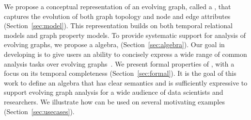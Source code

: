 
%
%
We propose a conceptual representation of an evolving graph, called a
\tg, that captures the evolution of both graph topology and node and
edge attributes (Section~\ref{sec:model}).  This representation builds
on both temporal relational models and graph property models.  To
provide systematic support for analysis of evolving graphs, we propose
a \tg algebra, \tga (Section~\ref{sec:algebra}).  Our goal in
developing \tga is to give users an ability to concisely express a
wide range of common analysis tasks over evolving
graphs~\cite{DBLP:journals/csur/AggarwalS14}.  We present formal
properties of \tga, with a focus on its temporal completeness
(Section~\ref{sec:formal}).  It is the goal of this work to define an
algebra that has clear semantics and is sufficiently expressive to
support evolving graph analysis for a wide audience of data scientists
and researchers.  We illustrate how \tga can be used on several
motivating examples (Section~\ref{sec:usecases}).



